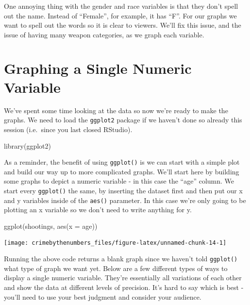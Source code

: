 \documentclass[
  12pt,
  openany]{book}
\newenvironment{Shaded}{\begin{snugshade}}{\end{snugshade}}
\newcommand{\AttributeTok}[1]{\textcolor[rgb]{0.61,0.61,0.61}{#1}}
\newcommand{\FunctionTok}[1]{\textcolor[rgb]{0,0,0}{#1}}
\newcommand{\NormalTok}[1]{#1}
\begin{document}
One annoying thing with the gender and race variables is that they don't spell out the name. Instead of ``Female'', for example, it has ``F''. For our graphs we want to spell out the words so it is clear to viewers. We'll fix this issue, and the issue of having many weapon categories, as we graph each variable.

\hypertarget{graphing-a-single-numeric-variable}{%
\section{Graphing a Single Numeric Variable}\label{graphing-a-single-numeric-variable}}

We've spent some time looking at the data so now we're ready to make the graphs. We need to load the \texttt{ggplot2} package if we haven't done so already this session (i.e.~since you last closed RStudio).

\begin{Shaded}
\begin{Highlighting}[]
\FunctionTok{library}\NormalTok{(ggplot2)}
\end{Highlighting}
\end{Shaded}

As a reminder, the benefit of using \texttt{ggplot()} is we can start with a simple plot and build our way up to more complicated graphs. We'll start here by building some graphs to depict a numeric variable - in this case the ``age'' column. We start every \texttt{ggplot()} the same, by inserting the dataset first and then put our x and y variables inside of the \texttt{aes()} parameter. In this case we're only going to be plotting an x variable so we don't need to write anything for y.

\begin{Shaded}
\begin{Highlighting}[]
\FunctionTok{ggplot}\NormalTok{(shootings, }\FunctionTok{aes}\NormalTok{(}\AttributeTok{x =}\NormalTok{ age))}
\end{Highlighting}
\end{Shaded}

\begin{center}\texttt{[image: crimebythenumbers\_files/figure-latex/unnamed-chunk-14-1]} \end{center}

Running the above code returns a blank graph since we haven't told \texttt{ggplot()} what type of graph we want yet. Below are a few different types of ways to display a single numeric variable. They're essentially all variations of each other and show the data at different levels of precision. It's hard to say which is best - you'll need to use your best judgment and consider your audience.
\end{document}
